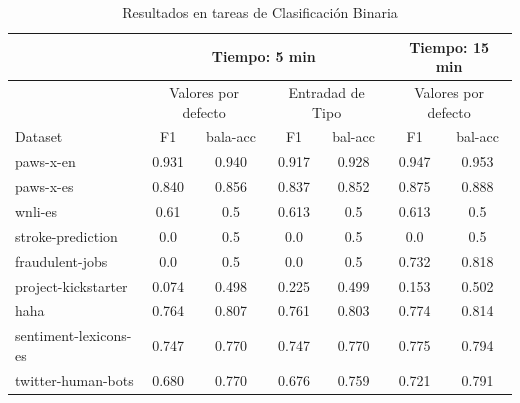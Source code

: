 \begin{table}[H]
  \centering
  \resizebox{15cm}{!} {
  \begin{tabular}{|l|cccccc|}
  \hline
          & \multicolumn{4}{p{8cm}|}{Tiempo: 5 min}  & \multicolumn{2}{p{4cm}|}{Tiempo: 15 min}\\  \hline
          & \multicolumn{2}{p{4cm}|}{Valores por defecto} & \multicolumn{2}{p{4cm}|}{Entradad de Tipo} & \multicolumn{2}{p{4cm}|}{Valores por defecto}\\ \hline
  Dataset & F1 & bala-acc & F1  & bal-acc & F1 & bal-acc  \\ \hline
  paws-x-en             & 0.931 & 0.940 & 0.917 & 0.928 & 0.947 & 0.953 \\
  paws-x-es             & 0.840 & 0.856 & 0.837 & 0.852 & 0.875 & 0.888 \\
  wnli-es               & 0.61  & 0.5   & 0.613 & 0.5   & 0.613 & 0.5   \\ 
  stroke-prediction     & 0.0   & 0.5   & 0.0   & 0.5   & 0.0   & 0.5 \\
  fraudulent-jobs       & 0.0   & 0.5   & 0.0   & 0.5   & 0.732 & 0.818 \\
  project-kickstarter   & 0.074 & 0.498 & 0.225 & 0.499 & 0.153 & 0.502 \\
  haha                  & 0.764 & 0.807 & 0.761 & 0.803 & 0.774 & 0.814 \\
  sentiment-lexicons-es & 0.747 & 0.770 & 0.747 & 0.770 & 0.775 & 0.794 \\ 
  twitter-human-bots    & 0.680 & 0.770 & 0.676 & 0.759 & 0.721 & 0.791 \\ \hline

  \end{tabular}
  \caption{Resultados en tareas de Clasificación Binaria}
  \label{fig:class-binary}
  }
\end{table}

